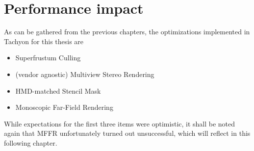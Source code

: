 
\chapter{Performance impact}
As can be gathered from the previous chapters, the optimizations implemented in Tachyon for this thesis are 
\begin{itemize}
\item Superfrustum Culling
\item (vendor agnostic) Multiview Stereo Rendering
\item HMD-matched Stencil Mask
\item Monoscopic Far-Field Rendering
\end{itemize}

While expectations for the first three items were optimistic, it shall be noted again that MFFR unfortunately turned out unsuccessful, which will reflect in this following chapter. 

